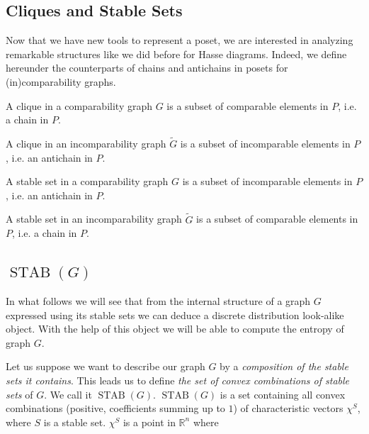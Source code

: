 \subsection{Cliques and Stable Sets}


Now that we have new tools to represent a poset, we are interested in analyzing remarkable structures like we did before for Hasse diagrams. Indeed, we define hereunder the counterparts of chains and antichains in posets for (in)comparability graphs.


A clique in a comparability graph ${G}$ is a subset of comparable  elements in ${P}$, i.e. a chain in ${P}$.

A clique in an incomparability graph $\widetilde{G}$ is a subset of incomparable  elements in ${P}$, i.e. an antichain in ${P}$.


A stable set in a comparability graph ${G}$ is a subset of incomparable elements in ${P}$, i.e. an antichain in ${P}$.

A stable set in an incomparability graph $\widetilde{G}$ is a subset of comparable elements in ${P}$, i.e. a chain in ${P}$.





\subsection{$\operatorname{STAB}(G)$}
\label{tree:poset:graph:stab}

In what follows we will see that from the internal structure of a graph $G$ expressed using its stable sets we can deduce a discrete distribution look-alike object. With the help of this object we will be able to compute the entropy of graph $G$.

Let us suppose we want to describe our graph $G$ by a \emph{composition of the stable sets it contains}. This leads us to define \emph{the set of convex combinations of stable sets} of $G$. We call it $\operatorname{STAB}(G)$. $\operatorname{STAB}(G)$ is a set containing all convex combinations (positive, coefficients summing up to $1$) of characteristic vectors $\chi^S$, where $S$ is a stable set. $\chi^S$ is a point in $\mathbb{R}^n$ where

